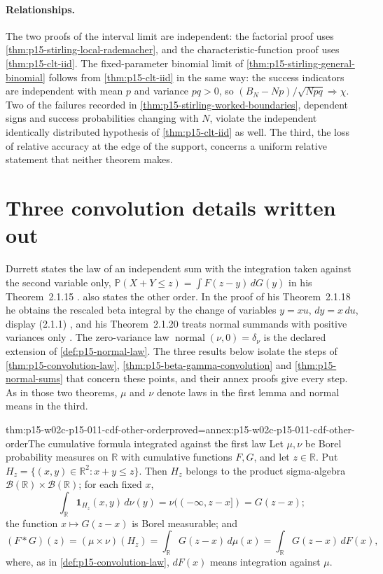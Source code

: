\paragraph{Relationships.}
The two proofs of the interval limit are independent: the factorial proof
uses \cref{thm:p15-stirling-local-rademacher}, and the characteristic-function
proof uses \cref{thm:p15-clt-iid}. The fixed-parameter binomial limit of
\cref{thm:p15-stirling-general-binomial} follows from \cref{thm:p15-clt-iid}
in the same way: the success indicators are independent with mean \(p\)
and variance \(pq>0\), so \((B_N-Np)/\sqrt{Npq}\Rightarrow\chi\). Two of the failures recorded in
\cref{thm:p15-stirling-worked-boundaries}, dependent signs and success
probabilities changing with \(N\), violate the independent identically
distributed hypothesis of \cref{thm:p15-clt-iid} as well. The third, the loss
of relative accuracy at the edge of the support, concerns a uniform relative
statement that neither theorem makes.

\section{Three convolution details written out}
\label{sec:p15-w02c-p15-011-convolution-details}

Durrett states the law of an independent sum with the integration taken
against the second variable only,
\(\mathbb P(X+Y\leq z)=\int F(z-y)\,dG(y)\) in his Theorem~2.1.15
\cite[pp.~49--50]{DurrettPTEAuthor2019}.
 also states the other order. In the proof of
his Theorem~2.1.18 he obtains the rescaled beta integral by the change of
variables \(y=xu\), \(dy=x\,du\), display (2.1.1)
\cite[p.~51]{DurrettPTEAuthor2019}, and his Theorem~2.1.20 treats normal
summands with positive variances only \cite[p.~52]{DurrettPTEAuthor2019}.
The zero-variance law \(\operatorname{normal}(\nu,0)=\delta_\nu\) is the
declared extension of \cref{def:p15-normal-law}. The three results below
isolate the steps of \cref{thm:p15-convolution-law},
\cref{thm:p15-beta-gamma-convolution} and \cref{thm:p15-normal-sums} that
concern these points, and their annex proofs give every step. As in those
two theorems, \(\mu\) and \(\nu\) denote laws in the first lemma and normal
means in the third.

\begin{hblemma}{thm:p15-w02c-p15-011-cdf-other-order}{proved=annex:p15-w02c-p15-011-cdf-other-order}{The cumulative formula integrated against the first law}
Let \(\mu,\nu\) be Borel probability measures on \(\mathbb R\) with
cumulative functions \(F,G\), and let \(z\in\mathbb R\). Put
\(H_z=\{(x,y)\in\mathbb R^2:x+y\leq z\}\). Then \(H_z\) belongs to the
product sigma-algebra \(\mathcal B(\mathbb R)\times\mathcal B(\mathbb R)\);
for each fixed \(x\),
\[
 \int_{\mathbb R}\mathbf1_{H_z}(x,y)\,d\nu(y)=\nu((-\infty,z-x])=G(z-x);
\]
the function \(x\mapsto G(z-x)\) is Borel measurable; and
\[
 (F*G)(z)=(\mu\times\nu)(H_z)=\int_{\mathbb R}G(z-x)\,d\mu(x)
         =\int_{\mathbb R}G(z-x)\,dF(x),
\]
where, as in \cref{def:p15-convolution-law}, \(dF(x)\) means integration
against \(\mu\).
\end{hblemma}

